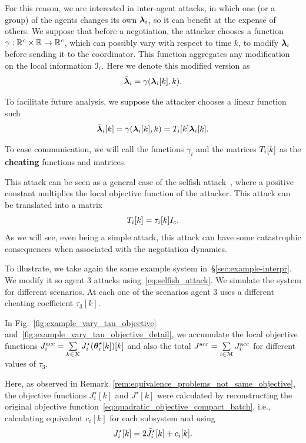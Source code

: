 \documentclass[../main.tex]{subfiles}
\begin{document}
For this reason, we are interested in inter-agent \fdi{} attacks, in which one (or a group) of the agents changes its own $\boldsymbol{\lambda}_i$, so it can benefit at the expense of others.
We suppose that before a negotiation, the attacker chooses a function ${\gamma:\mathbb{R}^{c}\times\mathbb{R}\to \mathbb{R}^{c}}$, which can possibly vary with respect to time $k$, to modify $\boldsymbol{\lambda}_i$ before sending it to the coordinator.
This function aggregates any modification on the local information $\mathcal{I}_{i}$.
Here we denote this modified version as
\begin{equation}
  \lambdaicheat=\gamma(\lambdaik,k).
\end{equation}

To facilitate future analysis, we suppose the attacker chooses a linear function such
\begin{equation}
  \label{eq:linear_attack}
  \lambdaicheat[k]=\gamma(\lambdaik,k)=\Tik\lambdaik.
\end{equation}

To ease communication, we will call the functions $\gamma_{i}$ and the matrices $T_{i}[k]$ as the \textbf{cheating} functions and matrices.

This attack can be seen as a general case of the selfish attack~\cite{VelardeEtAl2018},
where a positive constant multiplies the local objective function of the attacker.
This attack can be translated into a matrix
\begin{equation}
  \label{eq:selfish_attack}
  T_{i}[k]=\tau_{i}[k] I_{c}.
\end{equation}
As we will see, even being a simple attack, this attack can have some catastrophic consequences when associated with the negotiation dynamics.

To illustrate, we take again the same example system in~\S\ref{sec:example-interpr}.
We modify it so agent $3$ attacks using~\eqref{eq:selfish_attack}.
We simulate the system for different scenarios.
At each one of the scenarios agent $3$ uses a different cheating coefficient $\tau_{3}[k]$.

In Fig.~\ref{fig:example_vary_tau_objective} and~\ref{fig:example_vary_tau_objective_detail}, we accumulate the local objective functions
${J_{i}^{\text{acc}}=\sum\limits_{k\in\mathcal{K}}J_{i}^{\star}(\boldsymbol{\theta}_i^{\star}[k])[k]}$
and also the total ${J^{\text{acc}}=\sum\limits_{i\in\mathcal{M}}J_{i}^{\text{acc}}}$ for different values of $\tau_{3}$.

\begin{remark}
  Here, as observed in Remark~\ref{rem:equivalence_problems_not_same_objective}, the objective functions $J_{i}^{\star}[k]$ and $J^{\star}[k]$ were calculated by reconstructing the original objective function~\eqref{eq:quadratic_objective_compact_batch}, i.e., calculating equivalent $c_{i}[k]$ for each subsystem and using
  \begin{equation}
    J_{i}^{\star}[k] = 2\bar{J}_{i}^{\star}[k] + c_{i}[k].
\end{equation}
\end{remark}
\end{document}
